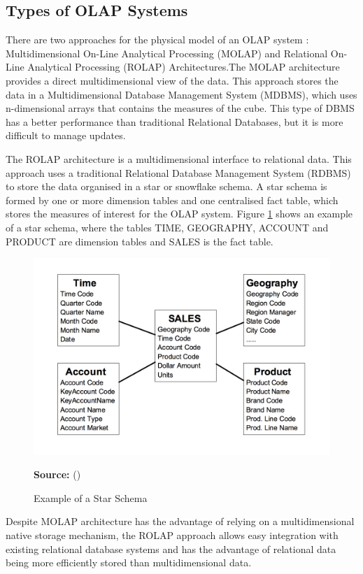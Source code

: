 \subsection{Types of OLAP Systems}
There are two approaches for the physical model of an OLAP system \cite{Vassiliadis1999}: Multidimensional On-Line Analytical Processing (MOLAP) and Relational On-Line Analytical Processing (ROLAP) Architectures.The MOLAP architecture provides a direct multidimensional view of the data. This approach stores the data in a Multidimensional Database Management System (MDBMS), which uses n-dimensional arrays that contains the measures of the cube. This type of DBMS has a better performance than traditional Relational Databases, but it is more difficult to manage updates.

The ROLAP architecture is a multidimensional interface to relational data. This approach uses a traditional Relational Database Management System (RDBMS) to store the data organised in a star or snowflake schema. A star schema is formed by one or more dimension tables and one centralised fact table, which stores the measures of interest for the OLAP system. Figure \ref{fig:figure3} shows an example of a star schema, where the tables TIME, GEOGRAPHY, ACCOUNT and PRODUCT are dimension tables and SALES is the fact table.

\begin{figure}[ht]
\centering
\caption{Example of a Star Schema}
\label{fig:figure3}
\includegraphics[width=.8\textwidth]{images/star_schema_example.png}
\par\medskip\ABNTEXfontereduzida\selectfont\textbf{Source:} \citeauthor{Vassiliadis1999} (\citeyear{Vassiliadis1999}) \par\medskip
\end{figure}

Despite MOLAP architecture has the advantage of relying on a multidimensional native storage mechanism, the ROLAP approach allows easy integration with existing relational database systems and has the advantage of relational data being more efficiently stored than multidimensional data.

